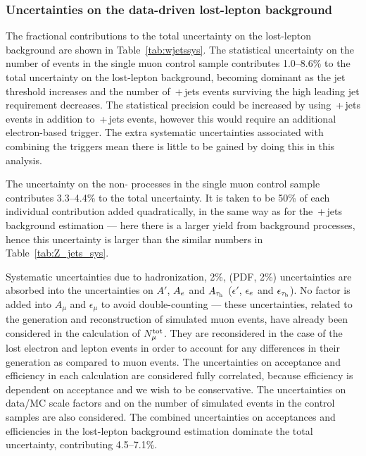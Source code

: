 \subsubsection{Uncertainties on the data-driven lost-lepton background}

The fractional contributions to the total uncertainty on the lost-lepton background are shown in Table~\ref{tab:wjetssys}.
The statistical uncertainty on the number of events in the single muon control sample contributes 1.0--8.6\% to the total uncertainty on the lost-lepton background, becoming dominant as the jet threshold increases and the number of \wmunubr{}\,+\,jets events surviving the high leading jet \pt{} requirement decreases.  
The statistical precision could be increased by using \wenubr\,+\,jets events in addition to \wmunubr{}\,+\,jets events, 
however this would require an additional electron-based trigger. 
The extra systematic uncertainties associated with combining the triggers mean there is little to be gained by doing this in this analysis.

The uncertainty on the non-\wpj{} processes in the single muon control sample contributes 3.3--4.4\% to the total uncertainty. 
It is taken to be 50\% of each individual contribution added quadratically, in the same way as for the \znunubr{}\,+\,jets background estimation --- here there is a larger yield from background processes, hence this uncertainty is larger than the similar numbers in Table~\ref{tab:Z_jets_sys}.

Systematic uncertainties due to hadronization, 2\%, (PDF, 2\%) uncertainties are absorbed into the uncertainties on $A'$, $A_{e}$ and $A_{\tau_\mathrm{h}}$ ($\epsilon'$, $\epsilon_{e}$ and $\epsilon_{\tau_\mathrm{h}}$).
No factor is added into $A_{\mu}$ and $\epsilon_{\mu}$ to avoid double-counting --- these 
uncertainties, related to the generation and reconstruction of simulated muon events, have already been considered in the calculation of $N^{\rm tot}_{\mu}$. 
They are reconsidered in the case of the lost electron and \tauh lepton events in order to account for any differences in their generation as compared to muon events.
The uncertainties on acceptance and efficiency in each calculation are considered fully correlated, 
because efficiency is dependent on acceptance and we wish to be conservative.
The uncertainties on data/MC scale factors and on the number of simulated events in the control samples are also considered.
The combined uncertainties on acceptances and efficiencies in the lost-lepton background estimation dominate the total uncertainty, contributing 4.5--7.1\%.


